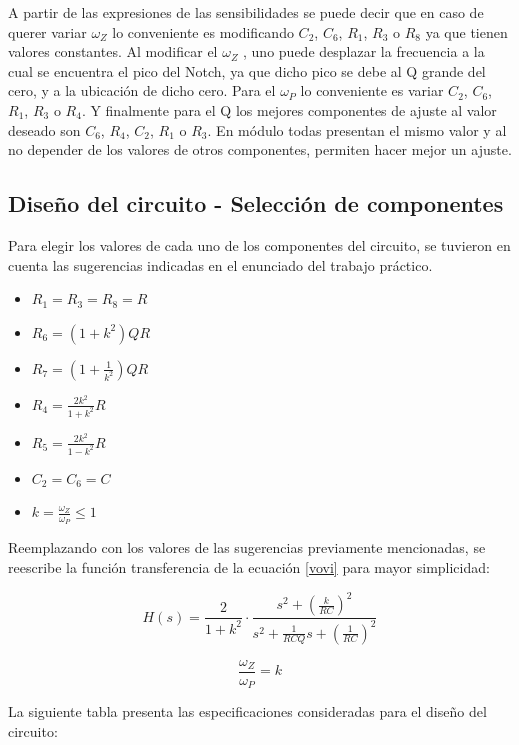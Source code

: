 A partir de las expresiones de las sensibilidades se puede decir que en caso de querer variar $\omega_Z$ lo conveniente es modificando $C_2$, $C_6$, $R_1$, $R_3$ o $R_8$ ya que tienen valores constantes. Al modificar el $\omega_Z$ , uno puede desplazar la frecuencia a la cual se encuentra el pico del Notch, ya que dicho pico se debe al Q grande del cero, y a la ubicaci\'on de dicho cero. Para el $\omega_P$ lo conveniente es variar $C_2$, $C_6$, $R_1$, $R_3$ o $R_4$. Y finalmente para el Q los mejores componentes de ajuste al valor deseado son $C_6$, $R_4$, $C_2$, $R_1$ o $R_3$. En m\'odulo todas presentan el mismo valor y al no depender de los valores de otros componentes, permiten hacer mejor un ajuste. 

\subsection{Dise\~no del circuito - Selecci\'on de componentes}
Para elegir los valores de cada uno de los componentes del circuito, se tuvieron en cuenta las sugerencias indicadas en el enunciado del trabajo pr\'actico.

\begin{itemize}
	\item $R_1 = R_3 = R_8 = R$
	\item $R_6 = (1 + k^2) Q R$
	\item $R_7 = (1 + \frac{1}{k^2})Q R$
	\item $R_4 = \frac{2k^2}{1+k^2}R$
	\item $R_5 = \frac{2k^2}{1-k^2}R$
	\item $C_2 = C_6 = C$
	\item $k = \frac{\omega_Z}{\omega_P} \leqslant 1 $
\end{itemize}

Reemplazando con los valores de las sugerencias previamente mencionadas, se reescribe la funci\'on transferencia de la ecuaci\'on \ref{vovi} para mayor simplicidad:

\begin{equation}
H(s) = \frac{2}{1+k^2} \cdot \frac{s^2 + \left( \frac{k}{RC}\right)^2}{s^2 + \frac{1}{RCQ} s + \left(\frac{1}{RC}\right)^2}
\label{vovi_simple}
\end{equation}

\begin{equation}
\frac{\omega_Z}{\omega_P} = k
\end{equation}

La siguiente tabla presenta las especificaciones consideradas para el dise\~no del circuito:

